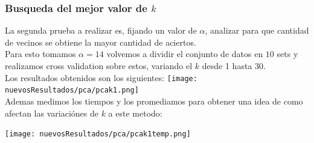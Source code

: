 \subsubsection{Busqueda del mejor valor de $k$}

La segunda prueba a realizar es, fijando un valor de $\alpha$, analizar para que cantidad de vecinos se obtiene la mayor cantidad de aciertos.
\\
Para esto tomamos $\alpha = 14$ volvemos a dividir el conjunto de datos en $10$ sets y realizamos cross validation sobre estos, variando el $k$ desde 1 hasta $30$.
\\
Los resultados obtenidos son los siguientes:
\texttt{[image: nuevosResultados/pca/pcak1.png]}\\

Ademas medimos los tiempos y los promediamos para obtener una idea de como afectan las variaciónes de $k$ a este metodo:

\texttt{[image: nuevosResultados/pca/pcak1temp.png]}\\


